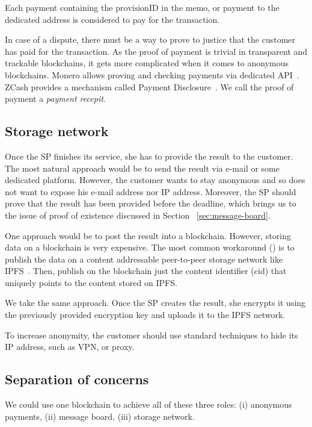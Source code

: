 Each payment containing the $\textrm{provisionID}$ in the memo, or payment to the dedicated address is considered to pay for the transaction. 

In case of a dispute, there must be a way to prove to justice that the customer has paid for the transaction. As the proof of payment is trivial in transparent and trackable blockchains, it gets more complicated when it comes to anonymous blockchains. Monero allows proving and checking payments via dedicated API~\cite{moneroHowProvePayment}. ZCash provides a mechanism called Payment Disclosure~\cite{daviesIntroductionPaymentDisclosure2017}. We call the proof of payment a \textit{payment recepit}.

\subsection{Storage network}\label{storage-network}
Once the SP finishes its service, she has to provide the result to the customer. The most natural approach would be to send the result via e-mail or some dedicated platform. However, the customer wants to stay anonymous and so does not want to expose his e-mail address nor IP address. Moreover, the SP should prove that the result has been provided before the deadline, which brings us to the issue of proof of existence discussed in Section ~\ref{sec:message-board}.

One approach would be to post the result into a blockchain. However, storing data on a blockchain is very expensive. The most common workaround (\cite{shahidBlockchainBasedAgriFoodSupply2020, wangAuditableProtocolsFair2019, chenImprovedP2PFile2017}) is to publish the data on a content addressable peer-to-peer storage network like IPFS~\cite{benetIPFSContentAddressed2014}. Then, publish on the blockchain just the content identifier ($\mathrm{cid}$) that uniquely points to the content stored on IPFS.

We take the same approach. Once the SP creates the result, she encrypts it using the previously provided encryption key and uploads it to the IPFS network.

To increase anonymity, the customer should use standard techniques to hide its IP address, such as VPN, or proxy.

\subsection{Separation of concerns}
We could use one blockchain to achieve all of these three roles: (i) anonymous payments, (ii) message board, (iii) storage network.

